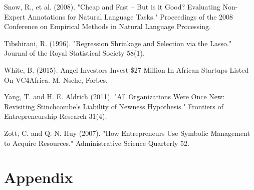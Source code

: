 \documentclass[12pt]{article}
\begin{document}
Snow, R., et al. (2008). "Cheap and Fast -- But is it Good? Evaluating Non-Expert Annotations for Natural Language Tasks." Proceedings of the 2008 Conference on Empirical Methods in Natural Language Processing.
	
Tibshirani, R. (1996). "Regression Shrinkage and Selection via the Lasso." Journal of the Royal Statistical Society 58(1).
	
White, B. (2015). Angel Investors Invest \$27 Million In African Startups Listed On VC4Africa. M. Nsehe, Forbes.
	
Yang, T. and H. E. Aldrich (2011). "All Organizations Were Once New: Revisiting Stinchcombe's Liability of Newness Hypothesis." Frontiers of Entrepreneurship Research 31(4).
	
Zott, C. and Q. N. Huy (2007). "How Entrepreneurs Use Symbolic Management to Acquire Resources." Administrative Science Quarterly 52.

\endgroup

\clearpage

\section{Appendix}

\setcounter{table}{0}
\renewcommand{\thetable}{A\arabic{table}}

\setcounter{figure}{0}
\renewcommand{\thefigure}{A\arabic{figure}}
\end{document}

